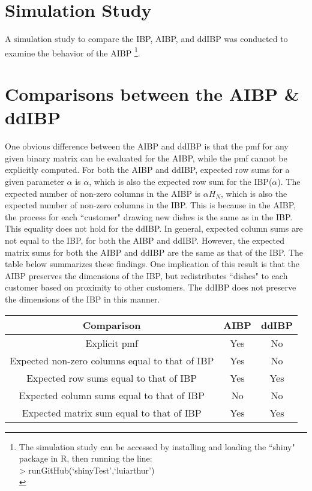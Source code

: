 \section{Simulation Study}
A simulation study to compare the IBP, AIBP, and ddIBP was conducted to examine the
behavior of the AIBP \footnote{The simulation study can be accessed by installing 
and loading the ``shiny" package in R, then running the line: \\
> runGitHub(`shinyTest',`luiarthur')\\}. 

\section{Comparisons between the AIBP \& ddIBP}
One obvious difference between the AIBP and ddIBP is that the pmf for any given 
binary matrix can be evaluated for the AIBP, while the pmf cannot be explicitly 
computed. For both the AIBP and ddIBP, expected row sums for a given parameter
$\alpha$ is $\alpha$, which is also the expected row sum for the IBP($\alpha$). 
The expected number of non-zero columns in the AIBP is $\alpha H_N$, which is also
the expected number of non-zero columns in the IBP. This is because in the AIBP,
the process for each ``customer" drawing new dishes is the same as in the IBP. This
equality does not hold for the ddIBP. In general, expected column sums are not
equal to the IBP, for both the AIBP and ddIBP. However, the expected matrix
sums for both the AIBP and ddIBP are the same as that of the IBP. The table below 
summarizes these findings. One implication of this result is that the AIBP 
preserves the dimensions of the IBP, but redistributes ``dishes" to each customer
based on proximity to other customers. The ddIBP does not preserve the dimensions
of the IBP in this manner. 

\begin{center}
  \begin{tabular}{c|c|c}
    \hline
      Comparison & AIBP & ddIBP \\ \hline \hline
      Explicit pmf & Yes & No \\ \hline
      Expected non-zero columns equal to that of IBP & Yes & No \\ \hline
      Expected row sums equal to that of IBP & Yes & Yes \\ \hline
      Expected column sums equal to that of IBP & No & No \\ \hline
      Expected matrix sum equal to that of IBP & Yes & Yes \\ \hline
    \hline
  \end{tabular}
\end{center}

